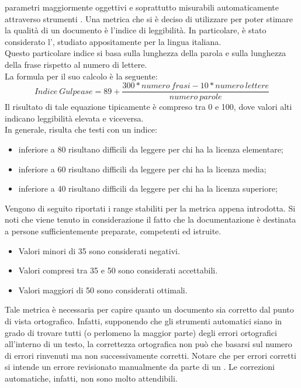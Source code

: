 				parametri maggiormente oggettivi e soprattutto misurabili automaticamente attraverso strumenti .
				 \label{subsec:gulpease}
					Una metrica che si è deciso di utilizzare per poter stimare la qualità di un documento è l'indice di leggibilità. In particolare, è 
					stato considerato l', studiato appositamente per la lingua italiana.\\
					Questo particolare indice si basa sulla lunghezza della parola e sulla lunghezza della frase rispetto al numero di lettere.\\
					La formula per il suo calcolo è la seguente:
					\begin{equation}
						\label{eq:gulpease}
						Indice\ Gulpease = 89 + \frac{300*numero\ frasi-10*numero\ lettere}{numero\ parole}
					\end{equation}
					Il risultato di tale equazione tipicamente è compreso tra 0 e 100, dove valori alti indicano leggibilità elevata e viceversa.\\
					In generale, risulta che testi con un indice:
					\begin{itemize}
						\item inferiore a 80 risultano difficili da leggere per chi ha la licenza elementare;
						\item inferiore a 60 risultano difficili da leggere per chi ha la licenza media;
						\item inferiore a 40 risultano difficili da leggere per chi ha la licenza superiore;
					\end{itemize}
					Vengono di seguito riportati i range stabiliti per la metrica appena introdotta. Si noti che viene tenuto in considerazione il fatto che la documentazione è destinata a persone sufficientemente preparate, competenti ed istruite.
					\begin{itemize}
						\item Valori minori di 35 sono considerati negativi.
						\item Valori compresi tra 35 e 50 sono considerati accettabili.
						\item Valori maggiori di 50 sono considerati ottimali.
					\end{itemize}
				 \label{subsec:erroriOrtografici}
					Tale metrica è necessaria per capire quanto un documento sia corretto dal punto di vista ortografico. Infatti, supponendo che gli strumenti automatici siano in grado di trovare tutti (o perlomeno la maggior parte) degli errori ortografici all'interno di un testo, la correttezza ortografica non può che basarsi sul numero di errori rinvenuti ma non successivamente corretti. Notare che per errori corretti si intende un errore revisionato manualmente da parte di un . Le correzioni automatiche, infatti, non sono molto attendibili.\\
